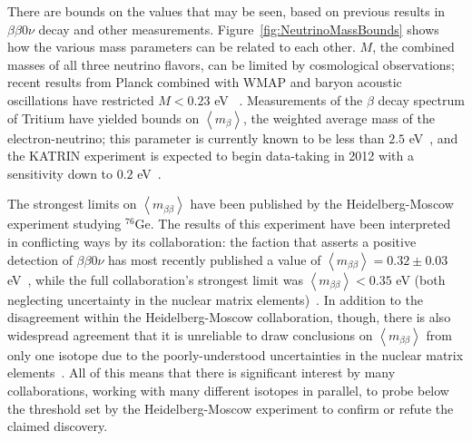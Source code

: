 There are bounds on the values that may be seen, based on previous results in $\beta\beta 0\nu$ decay and other measurements.  Figure~\ref{fig:NeutrinoMassBounds} shows how the various mass parameters can be related to each other.  $M$, the combined masses of all three neutrino flavors, can be limited by cosmological observations; recent results from Planck combined with WMAP and baryon acoustic oscillations have restricted $M < 0.23$ eV ~\cite{CosmologicalLimits}.  Measurements of the $\beta$ decay spectrum of Tritium have yielded bounds on $\left< m_\beta \right>$, the weighted average mass of the electron-neutrino; this parameter is currently known to be less than $2.5$ eV~\cite{OldTritium}, and the KATRIN experiment is expected to begin data-taking in 2012 with a sensitivity down to $0.2$ eV~\cite{NewTritium}.

The strongest limits on $\left< m_{\beta\beta} \right>$ have been published by the Heidelberg-Moscow experiment studying $^{76}$Ge.  The results of this experiment have been interpreted in conflicting ways by its collaboration:  the faction that asserts a positive detection of $\beta\beta 0\nu$ has most recently published a value of $\left< m_{\beta\beta} \right> = 0.32 \pm 0.03$ eV~\cite{Klapdor}, while the full collaboration's strongest limit was $\left< m_{\beta\beta} \right> < 0.35$ eV (both neglecting uncertainty in the nuclear matrix elements)~\cite{KlapdorDissent}.  In addition to the disagreement within the Heidelberg-Moscow collaboration, though, there is also widespread agreement that it is unreliable to draw conclusions on $\left< m_{\beta\beta} \right>$ from only one isotope due to the poorly-understood uncertainties in the nuclear matrix elements~\cite{RMPbb0n}.  All of this means that there is significant interest by many collaborations, working with many different isotopes in parallel, to probe below the threshold set by the Heidelberg-Moscow experiment to confirm or refute the claimed discovery.
